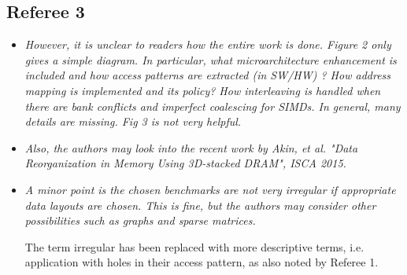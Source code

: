 \documentclass[12pt,a4paper,notitlepage]{article}
\begin{document}
\subsection*{Referee 3}

\begin{itemize}

\item \textit{However, it is unclear to readers how the entire work is done.  Figure 2 only gives a simple diagram.  In particular,  what microarchitecture enhancement is included and how access patterns are extracted (in SW/HW) ?  How address mapping is implemented and its policy?  How interleaving is handled when there are bank conflicts and imperfect coalescing for SIMDs.  In general,  many details are missing.  Fig 3 is not very helpful.}

\item \textit{Also, the authors may look into the recent work by Akin, et al. "Data Reorganization in Memory Using 3D-stacked DRAM", ISCA 2015.}

\item \textit{A minor point is the chosen benchmarks are not very irregular if appropriate data layouts are chosen.  This is fine, but the authors may consider other possibilities such as graphs and sparse matrices.}

The term irregular has been replaced with more descriptive terms, i.e. application with holes in their access pattern, as also noted by Referee 1. 

\end{itemize}



  
\end{document}

